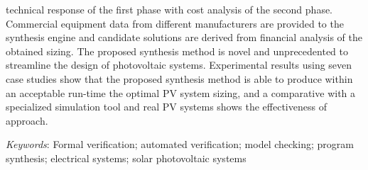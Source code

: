technical response of the first phase with cost analysis of the second phase. Commercial equipment data from different manufacturers are provided to the synthesis engine and candidate solutions are derived from financial analysis of the obtained sizing. The proposed synthesis method is novel and unprecedented to streamline the design of photovoltaic systems. Experimental results using seven case studies show that the proposed synthesis method is able to produce within an acceptable run-time the optimal PV system sizing, and a comparative with a specialized simulation tool and real PV systems shows the effectiveness of approach.



\textit{Keywords}: Formal verification; automated verification; model checking; program synthesis; electrical systems; solar photovoltaic systems
